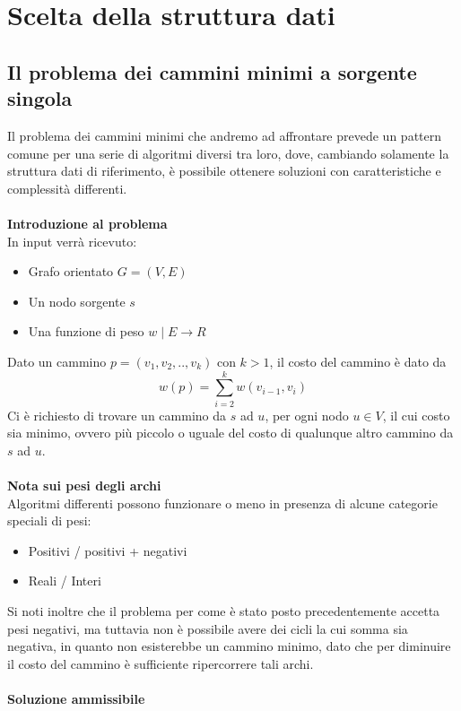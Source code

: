 \documentclass[../cheatSheetAlgoritmi.tex]{subfiles}
\begin{document}
\section{Scelta della struttura dati}
\subsection{Il problema dei cammini minimi a sorgente singola}
Il problema dei cammini minimi che andremo ad affrontare prevede un pattern comune per una serie di algoritmi diversi tra loro, dove, cambiando solamente la struttura dati di riferimento, è possibile ottenere soluzioni con caratteristiche e complessità differenti.
\\\\
\textbf{Introduzione al problema} \\
In input verrà ricevuto: 
\begin{itemize}
	\item  Grafo orientato $G = (V, E)$
	\item Un nodo sorgente $s$
	\item Una funzione di peso $w \mid E \rightarrow R$
\end{itemize} 
Dato un cammino $p = (v_1, v_2, .. , v_k)$ con $k > 1$, il costo del cammino è dato da 
\begin{equation*}
	w(p) = \sum_{i = 2}^{k} w(v_{i-1}, v_i)
\end{equation*}
Ci è richiesto di trovare un cammino da $s$ ad $u$, per ogni nodo $u \in V$, il cui costo sia minimo, ovvero più piccolo o uguale del costo di qualunque altro cammino da $s$ ad $u$.
\\\\
\textbf{Nota sui pesi degli archi} \\
Algoritmi differenti possono funzionare o meno in presenza di alcune categorie speciali di pesi:
\begin{itemize}
\item Positivi / positivi + negativi
\item Reali / Interi
\end{itemize}
Si noti inoltre che il problema per come è stato posto precedentemente accetta pesi negativi, ma tuttavia non è possibile avere dei cicli la cui somma sia negativa, in quanto non esisterebbe un cammino minimo, dato che per diminuire il costo del cammino è sufficiente ripercorrere tali archi.
\\\\
\textbf{Soluzione ammissibile} \\
\end{document}

